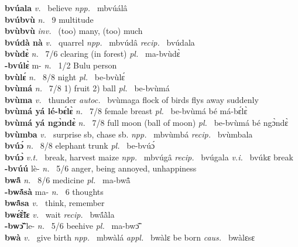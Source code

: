 {\bfseries bvúala}  {\itshape v.~} believe   {\itshape npp.~} mbvúálâ  \\ 
{\bfseries bvúbvù}  {\itshape n.~} 9 multitude    \\ 
{\bfseries bvùbvù}  {\itshape inv.~} (too) many, (too) much    \\ 
{\bfseries bvúdà nà}  {\itshape v.~} quarrel   {\itshape npp.~} mbvúdâ {\itshape recip.~} bvúdala  \\ 
{\bfseries bvùdɛ̀}  {\itshape n.~} 7/6 clearing (in forest) {\itshape pl.~} ma-bvùdɛ̀    \\ 
{\bfseries -bvúlɛ̀} m- {\itshape n.~} 1/2 Bulu person    \\ 
{\bfseries bvùlɛ́}  {\itshape n.~} 8/8 night {\itshape pl.~} be-bvùlɛ́    \\ 
{\bfseries bvùmá}  {\itshape n.~} 7/8 1) fruit 2) ball {\itshape pl.~} be-bvùmá    \\ 
{\bfseries bvùma}  {\itshape v.~} thunder   {\itshape autoc.~} bvùmaga flock of birds flys away suddenly  \\ 
{\bfseries bvùmá yá lé-bɛ́lɛ̀}  {\itshape n.~} 7/8 female breast  {\itshape pl.~} be-bvùmá bé má-bɛ́lɛ̀ \\ 
{\bfseries bvùmá yá ngɔ̀ndɛ̀}  {\itshape n.~} 7/8 full moon (ball of moon) {\itshape pl.~} be-bvùmá bé ngɔ̀ndɛ̀    \\ 
{\bfseries bvùmba}  {\itshape v.~} surprise sb, chase sb.   {\itshape npp.~} mbvùmbá {\itshape recip.~} bvùmbala  \\ 
{\bfseries bvúɔ́}  {\itshape n.~} 8/8 elephant trunk {\itshape pl.~} be-bvúɔ́    \\ 
{\bfseries bvúɔ̀}  {\itshape v.t.~} break, harvest maize   {\itshape npp.~} mbvúgâ {\itshape recip.~} bvúgala {\itshape v.i.~} bvúkɛ break  \\ 
{\bfseries -bvúú} lè- {\itshape n.~} 5/6 anger, being annoyed, unhappiness    \\ 
{\bfseries bwã̂}  {\itshape n.~} 8/6 medicine {\itshape pl.~} ma-bwã̂    \\ 
{\bfseries -bwã́sà} ma- {\itshape n.~} 6 thoughts \\ 
{\bfseries bwã̂sa}  {\itshape v.~} think, remember    \\ 
{\bfseries bwɛ̃́ɛ̃̀lɛ}  {\itshape v.~} wait   {\itshape recip.~} bwã́ã̀la  \\ 
{\bfseries -bwɔ̃̌} le- {\itshape n.~} 5/6 beehive {\itshape pl.~} ma-bwɔ̃̌   \\ 
{\bfseries bwà}  {\itshape v.~} give birth   {\itshape npp.~} mbwàlá {\itshape appl.~} bwàlɛ be born {\itshape caus.~} bwàlɛsɛ  \\ 
